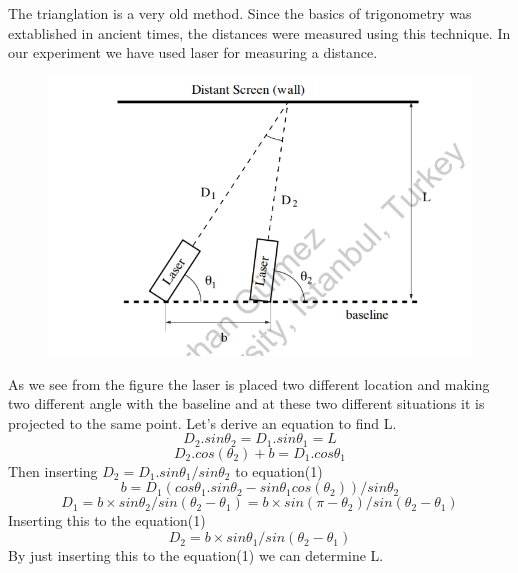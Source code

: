 \documentclass[11pt,a4paper]{article}
\begin{document}
{		\par The trianglation is a very old method. Since the basics of trigonometry was extablished in ancient times, the distances were measured using this technique. In our experiment we have used laser for measuring a distance.
		\begin{figure}[H]
			\begin{center}
				\includegraphics[scale=0.6]{triang.png}
			\end{center}
		\end{figure}
		As we see from the figure the laser is placed two different location and making two different angle with the baseline and at these two different situations it is projected to the same point. Let's derive an equation to find L.
		\begin{equation}
		D_2.sin\theta_2=D_1.sin\theta_1=L
		\end{equation}
		\begin{equation}
		D_2.cos(\theta_2)+b=D_1.cos\theta_1
		\end{equation}
		Then inserting $D_2=D_1.sin\theta_1/sin\theta_2$ to equation(1)
		\begin{equation}
		b=D_1(cos\theta_1.sin\theta_2-sin\theta_1cos(\theta_2))/sin\theta_2
		\end{equation}
		\begin{equation}
		D_1=b\times sin\theta_2/sin(\theta_2-\theta_1)=b\times sin(\pi-\theta_2)/sin(\theta_2-\theta_1)
		\end{equation}
		Inserting this to the equation(1)
		\begin{equation}
		D_2=b\times sin\theta_1/sin(\theta_2-\theta_1)
		\end{equation}
		By just inserting this to the equation(1) we can determine L.
}
\end{document}
